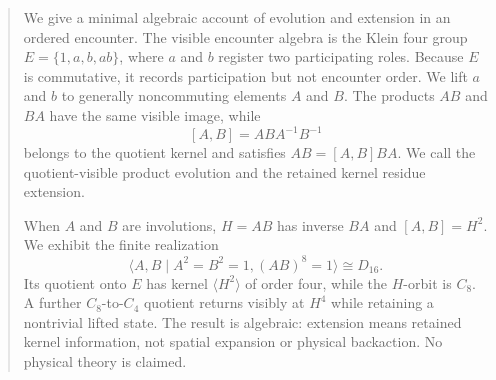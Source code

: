 \begin{abstract}
We give a minimal algebraic account of evolution and extension in an
ordered encounter. The visible encounter algebra is the Klein four
group \(E=\{1,a,b,ab\}\), where \(a\) and \(b\) register two
participating roles. Because \(E\) is commutative, it records
participation but not encounter order. We lift \(a\) and \(b\) to
generally noncommuting elements \(A\) and \(B\). The products \(AB\)
and \(BA\) have the same visible image, while
\[
[A,B]=ABA^{-1}B^{-1}
\]
belongs to the quotient kernel and satisfies \(AB=[A,B]BA\). We call the
quotient-visible product evolution and the retained kernel residue
extension.

When \(A\) and \(B\) are involutions, \(H=AB\) has inverse \(BA\) and
\([A,B]=H^2\). We exhibit the finite realization
\[
\langle A,B\mid A^2=B^2=1,(AB)^8=1\rangle\cong D_{16}.
\]
Its quotient onto \(E\) has kernel \(\langle H^2\rangle\) of order
four, while the \(H\)-orbit is \(C_8\). A further \(C_8\)-to-\(C_4\)
quotient returns visibly at \(H^4\) while
retaining a nontrivial lifted state. The result is algebraic:
extension means retained kernel information, not spatial expansion or
physical backaction. No physical theory is claimed.
\end{abstract}
